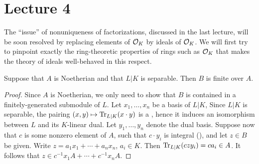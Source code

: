 \section{Lecture 4}

The ``issue'' of nonuniqueness of factorizations, discussed in the last lecture, will be soon resolved by replacing elements of $\mathcal{O}_{K}$ by ideals of $\mathcal{O}_{K}$.
We will first try to pinpoint exactly the ring-theoretic properties of rings such as $\mathcal{O}_{K}$ that makes the theory of ideals well-behaved in this respect.

\begin{proposition}
  Suppose that $A$ is Noetherian and that $L|K$ is separable.
  Then $B$ is finite over $A$.
\end{proposition}
\begin{proof}
  Since $A$ is Noetherian, we only need to show that $B$ is contained in a finitely-generated submodule of $L$.
  Let $x_{1},\ldots,x_{n}$ be a basis of $L|K$, 
  Since $L|K$ is separable, the pairing $(x,y) \mapsto \operatorname{Tr}_{L|K}(x \cdot y)$ is a , hence it induces an isomorphism between $L$ and its $K$-linear dual.
  Let $y_{1},\ldots,y_{n}$ denote the dual basis.
  Suppose now that $c$ is some nonzero element of $A$, such that $c \cdot y_{i}$ is integral (), and let $z \in B$ be given.
  Write $z = a_{1}x_{1} + \cdots + a_{n} x_{n}$, $a_{i} \in K$.
  Then $\operatorname{Tr}_{L|K}(czy_{i}) = ca_{i} \in A$.
  It follows that $z \in c^{-1}x_{1} A + \cdots + c^{-1} x_{n} A$.
\end{proof}

